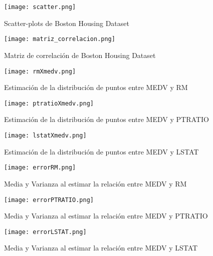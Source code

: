 \begin{figure}[h]
    \centering
    \texttt{[image: scatter.png]}
    \caption{Scatter-plots de Boston Housing Dataset}
    \label{scatter}
\end{figure}
\begin{figure}[h]
    \centering
    \texttt{[image: matriz\_correlacion.png]}
    \caption{Matriz de correlación de Boston Housing Dataset}
    \label{matriz_correlacion}
\end{figure}
\begin{figure}[h]
    \centering
    \texttt{[image: rmXmedv.png]}
    \caption{Estimación de la distribución de puntos entre MEDV y RM}
    \label{rmXmedv}
\end{figure}
\begin{figure}[h]
    \centering
    \texttt{[image: ptratioXmedv.png]}
    \caption{Estimación de la distribución de puntos entre MEDV y PTRATIO}
    \label{ptratioXmedv}
\end{figure}
\begin{figure}[h]
    \centering
    \texttt{[image: lstatXmedv.png]}
    \caption{Estimación de la distribución de puntos entre MEDV y LSTAT}
    \label{lstatXmedv}
\end{figure}
\begin{figure}[h]
    \centering
    \texttt{[image: errorRM.png]}
    \caption{Media y Varianza al estimar la relación entre MEDV y RM}
    \label{errorRM}
\end{figure}
\begin{figure}[h]
    \centering
    \texttt{[image: errorPTRATIO.png]}
    \caption{Media y Varianza al estimar la relación entre MEDV y PTRATIO}
    \label{errorPTRATIO}
\end{figure}
\begin{figure}[h]
    \centering
    \texttt{[image: errorLSTAT.png]}
    \caption{Media y Varianza al estimar la relación entre MEDV y LSTAT}
    \label{errorLSTAT}
\end{figure}